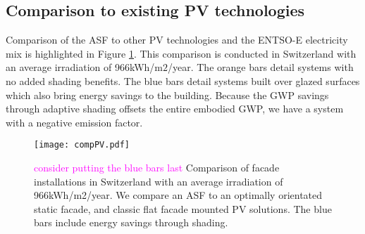 \subsection{Comparison to existing PV technologies}

Comparison of the ASF to other PV technologies and the ENTSO-E electricity mix is highlighted in Figure \ref{fig:compPV}. This comparison is conducted in Switzerland with an average irradiation of 966kWh/m$2$/year.
The orange bars detail systems with no added shading benefits. The blue bars detail systems built over glazed surfaces which also bring energy savings to the building. Because the GWP savings through adaptive shading offsets the entire embodied GWP, we have a system with a negative emission factor.




\begin{figure}[H]
\begin{center}
\texttt{[image: compPV.pdf]}
\caption{\textcolor{magenta}{consider putting the blue bars last} Comparison of facade installations in Switzerland with an average irradiation of 966kWh/m2/year.
We compare an ASF to an optimally orientated static facade, and classic flat facade mounted PV solutions. The blue bars include energy savings through shading.}
\label{fig:compPV}
\end{center}
\end{figure}





